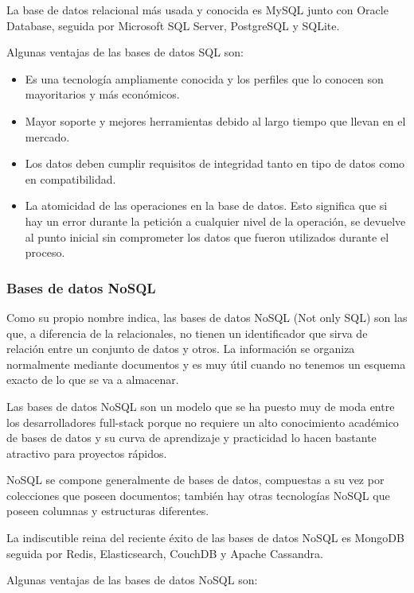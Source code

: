 La base de datos relacional más usada y conocida es MySQL junto con Oracle Database, seguida por Microsoft SQL Server, PostgreSQL y SQLite.

Algunas ventajas de las bases de datos SQL son:

\begin{itemize}
  \item Es una tecnología ampliamente conocida y los perfiles que lo conocen son mayoritarios y más económicos.
  \item Mayor soporte y mejores herramientas debido al largo tiempo que llevan en el mercado.
  \item Los datos deben cumplir requisitos de integridad tanto en tipo de datos como en compatibilidad.
  \item La atomicidad de las operaciones en la base de datos. Esto significa que si hay un error durante la petición a cualquier nivel de la operación, se devuelve al punto inicial sin comprometer los datos que fueron utilizados durante el proceso.
\end{itemize}

\subsubsection{Bases de datos NoSQL}

Como su propio nombre indica, las bases de datos NoSQL (Not only SQL) son las que, a diferencia de la relacionales, no tienen un identificador que sirva de relación entre un conjunto de datos y otros. La información se organiza normalmente mediante documentos y es muy útil cuando no tenemos un esquema exacto de lo que se va a almacenar.

Las bases de datos NoSQL son un modelo que se ha puesto muy de moda entre los desarrolladores full-stack porque no requiere un alto conocimiento académico de bases de datos y su curva de aprendizaje y practicidad lo hacen bastante atractivo para proyectos rápidos.

NoSQL se compone generalmente de bases de datos, compuestas a su vez por colecciones que poseen documentos; también hay otras tecnologías NoSQL que poseen columnas y estructuras diferentes.

La indiscutible reina del reciente éxito de las bases de datos NoSQL es MongoDB seguida por Redis, Elasticsearch, CouchDB y Apache Cassandra.

Algunas ventajas de las bases de datos NoSQL son:

